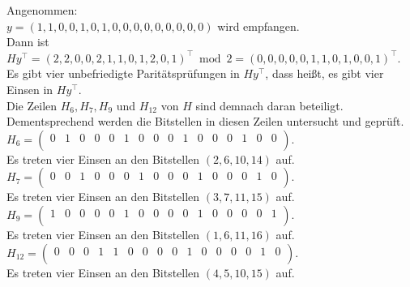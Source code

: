 \begin{Beispiel}
    Angenommen:\\
    $y = (1,1,0,0,1,0,1,0,0,0,0,0,0,0,0,0)$ wird empfangen.\\
    
    Dann ist $Hy^\intercal = (2,2,0,0,2,1,1,0,1,2,0,1)^\intercal \bmod 2 = (0,0,0,0,0,1,1,0,1,0,0,1)^\intercal$.\\
    
    Es gibt vier unbefriedigte Paritätsprüfungen in $Hy^\intercal$, 
    dass hei\ss{}t, es gibt vier Einsen in $Hy^\intercal.$\\
    Die Zeilen $H_6, H_7, H_9$ und $H_{12}$ von $H$ sind demnach daran beteiligt.\\ 
    Dementsprechend werden die Bitstellen in diesen Zeilen untersucht und geprüft.\\
    
    $H_6= \left( \begin{array}{rrrrrrrrrrrrrrrr}
        0 & 1 & 0 & 0 & 0 & 1 & 0 & 0 & 0 & 1 & 0 & 0 & 0 & 1 & 0 & 0 \\
       \end{array}\right). 
    $\\
    Es treten vier Einsen an den Bitstellen $(2, 6, 10, 14)$ auf.\\
    
    $H_7= \left( \begin{array}{rrrrrrrrrrrrrrrr}
        0 & 0 & 1 & 0 & 0 & 0 & 1 & 0 & 0 & 0 & 1 & 0 & 0 & 0 & 1 & 0 \\
       \end{array}\right). 
    $\\
    Es treten vier Einsen an den Bitstellen $(3, 7, 11, 15)$ auf.\\
    
    $H_9= \left( \begin{array}{rrrrrrrrrrrrrrrr}
        1 & 0 & 0 & 0 & 0 & 1 & 0 & 0 & 0 & 0 & 1 & 0 & 0 & 0 & 0 & 1 \\
       \end{array}\right). 
    $\\
    Es treten vier Einsen an den Bitstellen $(1, 6, 11, 16)$ auf.\\
    
    $H_{12}= \left( \begin{array}{rrrrrrrrrrrrrrrr}
        0 & 0 & 0 & 1 & 1 & 0 & 0 & 0 & 0 & 1 & 0 & 0 & 0 & 0 & 1 & 0 \\
       \end{array}\right). 
    $\\
    Es treten vier Einsen an den Bitstellen $(4, 5, 10, 15)$ auf.\\
    

\end{Beispiel}
